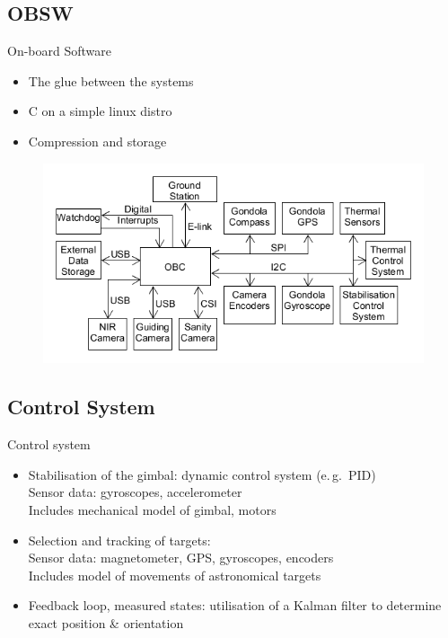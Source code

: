 \documentclass[11pt, aspectratio=169]{beamer}
\begin{document}
\subsection{OBSW} 	%
\begin{frame}{On-board Software}
\begin{itemize}
	\item The glue between the systems
	\item C on a simple linux distro
	\item Compression and storage
\end{itemize}
\begin{figure}
	\includegraphics[scale=0.4]{figures/images/process-overview.png}
\end{figure}
\end{frame}

\subsection{Control System} 	%
\begin{frame}[t]{Control system}
\begin{itemize}
	\item<1-> Stabilisation of the gimbal: dynamic control system (e.\,g.~PID) \\
		Sensor data: gyroscopes, accelerometer\\
		Includes mechanical model of gimbal, motors
	\item<2-> Selection and tracking of targets: \\
		Sensor data: magnetometer, GPS, gyroscopes, encoders \\
		Includes model of movements of astronomical targets
	\item<3-> Feedback loop, measured states: utilisation of a Kalman filter to determine exact position \& orientation
\end{itemize}

\end{frame}
\end{document}
